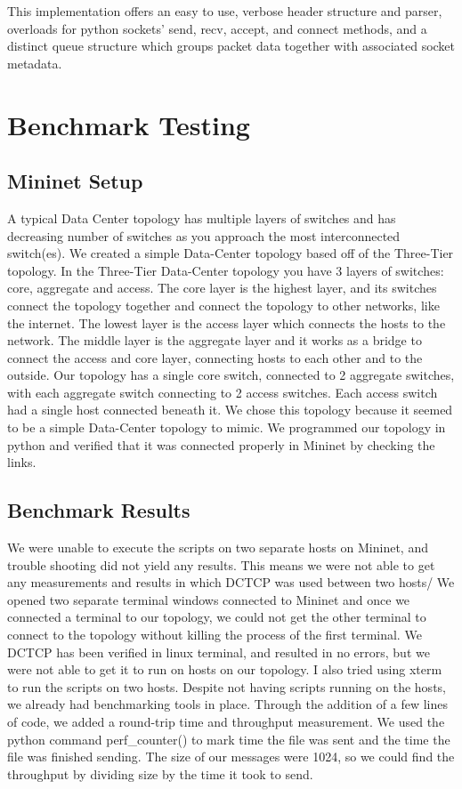 \documentclass[%
 reprint,
amsmath,amssymb,
aps,
]{revtex4-2}
\begin{document}
This implementation offers an easy to use, verbose header structure and parser, overloads for python sockets' send, recv, accept, and connect methods, and a distinct queue structure which groups packet data together with associated socket metadata. 

\section{Benchmark Testing}
\subsection{Mininet Setup}
A typical Data Center topology has multiple layers of switches and has decreasing number of switches as you approach the most interconnected switch(es). We created a simple Data-Center topology based off of the Three-Tier topology. In the Three-Tier Data-Center topology you have 3 layers of switches: core, aggregate and access. The core layer is the highest layer, and its switches connect the topology together and connect the topology to other networks, like the internet. The lowest layer is the access layer which connects the hosts to the network. The middle layer is the aggregate layer and it works as a bridge to connect the access and core layer, connecting hosts to each other and to the outside. Our topology has a single core switch, connected to 2 aggregate switches, with each aggregate switch connecting to 2 access switches. Each access switch had a single host connected beneath it. We chose this topology because it seemed to be a simple Data-Center topology to mimic. We programmed our topology in python and verified that it was connected properly in Mininet by checking the links. 
\subsection{Benchmark Results}
We were unable to execute the scripts on two separate hosts on Mininet, and trouble shooting did not yield any results. This means we were not able to get any measurements and results in which DCTCP was used between two hosts/ We opened two separate terminal windows connected to Mininet and once we connected a terminal to our topology, we could not get the other terminal to connect to the topology without killing the process of the first terminal. We DCTCP has been verified in linux terminal, and resulted in no errors, but we were not able to get it to run on hosts on our topology. I also tried using xterm to run the scripts on two hosts. Despite not having scripts running on the hosts, we already had benchmarking tools in place. Through the addition of a few lines of code, we added a round-trip time and throughput measurement. We used the python command perf\_counter() to mark time the file was sent and the time the file was finished sending. The size of our messages were 1024, so we could find the throughput by dividing size by the time it took to send.
\end{document}
